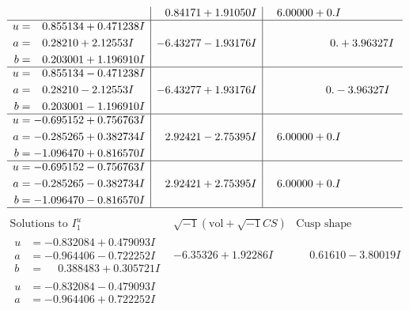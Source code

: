 \documentclass[1p]{elsarticle_modified}
\theoremstyle{definition}
\newcommand{\I}{\sqrt{-1}}
\begin{document}
$$\begin{array}{c|c|c}
 & \phantom{-}0.84171 + 1.91050 I & \phantom{-}6.00000 + 0. I\phantom{ +0.000000I} \\ \hline\begin{aligned}
u &= \phantom{-}0.855134 + 0.471238 I \\
a &= \phantom{-}0.28210 + 2.12553 I \\
b &= \phantom{-}0.203001 + 1.196910 I\end{aligned}
 & -6.43277 - 1.93176 I & \phantom{-0.000000 -}0. + 3.96327 I \\ \hline\begin{aligned}
u &= \phantom{-}0.855134 - 0.471238 I \\
a &= \phantom{-}0.28210 - 2.12553 I \\
b &= \phantom{-}0.203001 - 1.196910 I\end{aligned}
 & -6.43277 + 1.93176 I & \phantom{-0.000000 } 0. - 3.96327 I \\ \hline\begin{aligned}
u &= -0.695152 + 0.756763 I \\
a &= -0.285265 + 0.382734 I \\
b &= -1.096470 + 0.816570 I\end{aligned}
 & \phantom{-}2.92421 - 2.75395 I & \phantom{-}6.00000 + 0. I\phantom{ +0.000000I} \\ \hline\begin{aligned}
u &= -0.695152 - 0.756763 I \\
a &= -0.285265 - 0.382734 I \\
b &= -1.096470 - 0.816570 I\end{aligned}
 & \phantom{-}2.92421 + 2.75395 I & \phantom{-}6.00000 + 0. I\phantom{ +0.000000I}\\
 \hline 
 \end{array}$$\newpage$$\begin{array}{c|c|c}  
\text{Solutions to }I^u_{1}& \I (\text{vol} + \sqrt{-1}CS) & \text{Cusp shape}\\
 \hline 
\begin{aligned}
u &= -0.832084 + 0.479093 I \\
a &= -0.964406 - 0.722252 I \\
b &= \phantom{-}0.388483 + 0.305721 I\end{aligned}
 & -6.35326 + 1.92286 I & \phantom{-}0.61610 - 3.80019 I \\ \hline\begin{aligned}
u &= -0.832084 - 0.479093 I \\
a &= -0.964406 + 0.722252 I \\

\end{aligned}
\end{array}$$
\end{document}
